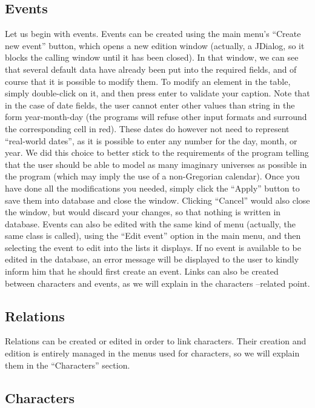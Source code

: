 \documentclass[a4paper ,12pt,french]{article}
\begin{document}
\subsection{Events}

Let us begin with events. 
Events can be created using the main menu’s “Create new event” button, which opens a new edition window (actually, a JDialog, so it blocks the calling window until it has been closed). In that window, we can see that several default data have already been put into the required fields, and of course that it is possible to modify them. To modify an element in the table, simply double-click on it, and then press enter to validate your caption. Note that in the case of date fields, the user cannot enter other values than string in the form year-month-day (the programs will refuse other input formats and surround the corresponding cell in red). These dates do however not need to represent “real-world dates”, as it is possible to enter any number for the day, month, or year. We did this choice to better stick to the requirements of the program telling that the user should be able to model as many imaginary universes as possible in the program (which may imply the use of a non-Gregorian calendar). Once you have done all the modifications you needed, simply click the “Apply” button to save them into database and close the window. Clicking “Cancel” would also close the window, but would discard your changes, so that nothing is written in database.
Events can also be edited with the same kind of menu (actually, the same class is called), using the “Edit event” option in the main menu, and then selecting the event to edit into the lists it displays. If no event is available to be edited in the database, an error message will be displayed to the user to kindly inform him that he should first create an event.
Links can also be created between characters and events, as we will explain in the characters –related point.

\subsection*{Relations}

Relations can be created or edited in order to link characters. Their creation and edition is entirely managed in the menus used for characters, so we will explain them in the “Characters” section.

\subsection{Characters}
\end{document}
